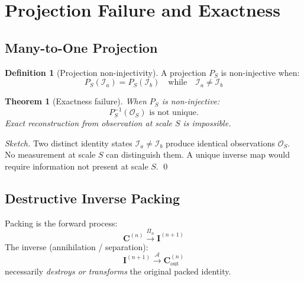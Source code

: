 \documentclass[11pt, a4paper, oneside]{article}
\theoremstyle{definition}
\newtheorem{definition}{Definition}[section]
\theoremstyle{plain}
\newtheorem{theorem}{Theorem}[section]
\theoremstyle{remark}
\newcommand{\Obs}{\mathcal{O}}
\begin{document}
\section{Projection Failure and Exactness}

\subsection{Many-to-One Projection}

\begin{definition}[Projection non-injectivity]
  A projection $P_S$ is non-injective when:
  \begin{equation}
	P_S(\mathcal{I}_a) = P_S(\mathcal{I}_b)
	\quad \text{while} \quad
	\mathcal{I}_a \neq \mathcal{I}_b
  \end{equation}
\end{definition}

\begin{theorem}[Exactness failure]
  When $P_S$ is non-injective:
  \begin{equation}
	P_S^{-1}(\Obs_S) \text{ is not unique.}
  \end{equation}
  Exact reconstruction from observation at scale $S$ is impossible.
\end{theorem}

\begin{proof}[Sketch]
  Two distinct identity states $\mathcal{I}_a \neq \mathcal{I}_b$ produce
  identical observations $\Obs_S$. No measurement at scale $S$ can
  distinguish them. A unique inverse map would require information not
  present at scale $S$. \qed
\end{proof}

\subsection{Destructive Inverse Packing}

Packing is the forward process:
\begin{equation}
  \mathbf{C}^{(n)} \xrightarrow{\Pi_n} \mathbf{I}^{(n+1)}
  \label{eq:packing}
\end{equation}
The inverse (annihilation / separation):
\begin{equation}
  \mathbf{I}^{(n+1)} \xrightarrow{\mathcal{A}} \mathbf{C}_\text{out}^{(n)}
  \label{eq:annihilation}
\end{equation}
necessarily \emph{destroys or transforms} the original packed identity.
\end{document}
